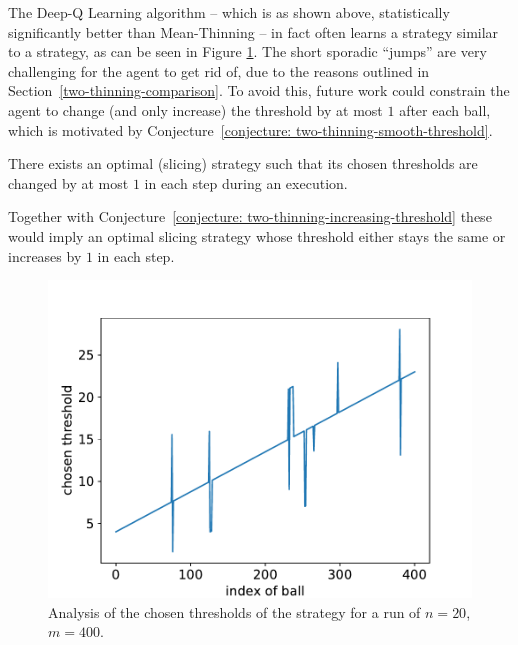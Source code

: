 The Deep-Q Learning algorithm -- which is as shown above, statistically significantly better than Mean-Thinning -- in fact often learns a strategy similar to a \ConstantOffset strategy, as can be seen in Figure \ref{two-thinning-dqn-thresholds}. The short sporadic ``jumps'' are very challenging for the agent to get rid of, due to the reasons outlined in Section~\ref{two-thinning-comparison}. To avoid this, future work could constrain the agent to change (and only increase) the threshold by at most $1$ after each ball, which is motivated by Conjecture~\ref{conjecture: two-thinning-smooth-threshold}.


\begin{conjecture}\label{conjecture: two-thinning-smooth-threshold}
There exists an optimal (slicing) strategy such that its chosen thresholds are changed by at most $1$ in each step during an execution.
\end{conjecture}


\begin{remark}
Together with Conjecture~\ref{conjecture: two-thinning-increasing-threshold} these would imply an optimal slicing strategy whose threshold either stays the same or increases by $1$ in each step.
\end{remark}


\begin{figure}[h]
    \centering
    \includegraphics[scale=0.6]{Chapter4/Figs/dqn_learnt_thresholds_20_400.pdf}
    \caption{Analysis of the chosen thresholds of the \DQN strategy for a run of $n=20$, $m=400$.}
    \label{two-thinning-dqn-thresholds}
\end{figure}



